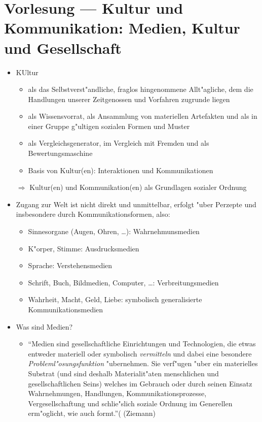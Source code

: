 \section{Vorlesung  --- Kultur und Kommunikation: Medien, Kultur und Gesellschaft}

\begin{itemize}
	\item
		KUltur 
		\begin{itemize}
			\item
				als das Selbstverst"andliche, fraglos hingenommene Allt"agliche, dem die Handlungen unserer Zeitgenossen und Vorfahren zugrunde liegen
			\item
				als Wissensvorrat, als Ansammlung von materiellen Artefakten und als in einer Gruppe g"ultigen sozialen Formen und Muster
			\item
				als Vergleichsgenerator, im Vergleich mit Fremden und als Bewertungsmaschine
			\item
				Basis von Kultur(en): Interaktionen und Kommunikationen
		\end{itemize}
	\item[$\Rightarrow$] Kultur(en) und Kommunikation(en) als Grundlagen sozialer Ordnung
	\item
		Zugang zur Welt ist nicht direkt und unmittelbar, erfolgt "uber Perzepte und insbesondere durch Kommunikationsformen, also:
		\begin{itemize}
			\item
				Sinnesorgane (Augen, Ohren, \dots): Wahrnehmunsmedien
			\item
				K"orper, Stimme: Ausdrucksmedien
			\item
				Sprache: Verstehensmedien
			\item
				Schrift, Buch, Bildmedien, Computer, \dots: Verbreitungsmedien
			\item
				Wahrheit, Macht, Geld, Liebe: symbolisch generalisierte Kommunikationsmedien
		\end{itemize}
	\item
		Was sind Medien?
		\begin{itemize}
			\item
				\enquote{Medien sind gesellschaftliche Einrichtungen und Technologien, die etwas entweder materiell oder symbolisch \textit{vermitteln} und dabei eine besondere \textit{Probleml"osungsfunktion} "ubernehmen. Sie verf"ugen "uber ein materielles Substrat (und sind deshalb Materialit"aten menschlichen und gesellschaftlichen Seins) welches im Gebrauch oder durch seinen Einsatz Wahrnehmungen, Handlungen, Kommunikationsprozesse, Vergesellschaftung und schlie"slich soziale Ordnung im Generellen erm"oglicht, wie auch formt.}( (Ziemann)\label{Ziemann}

\end{itemize}
\end{itemize}
